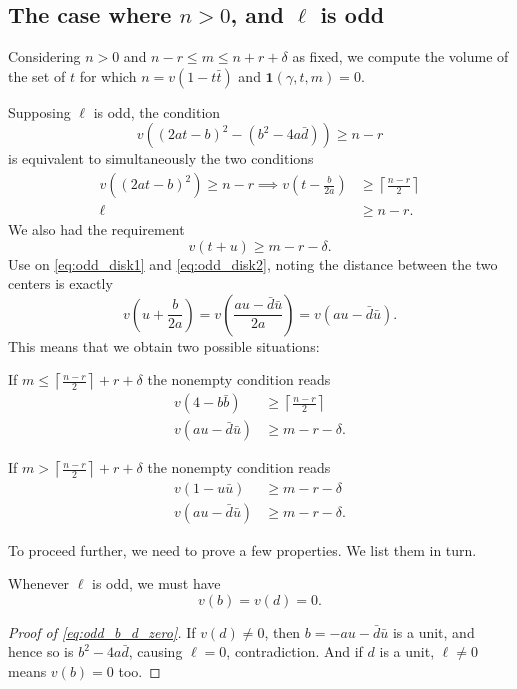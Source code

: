 \subsection{The case where $n > 0$, and $\ell$ is odd}
Considering $n > 0$ and $n-r \le m \le n+r+\delta$ as fixed,
we compute the volume of the set of $t$
for which $n = v(1-t\bar t)$ and $\mathbf{1}(\gamma,t,m) = 0$.

Supposing $\ell$ is odd, the condition
\[ v\left( (2at-b)^2 - (b^2-4a\bar d) \right) \geq n-r \]
is equivalent to simultaneously the two conditions
\begin{align}
  v\left( (2at-b)^2 \right) \geq n-r
  \implies v\left( t-\frac{b}{2a} \right) &\geq \left\lceil \frac{n-r}{2} \right\rceil
  \label{eq:odd_disk1} \\
  \ell &\ge n-r. \label{eq:odd_n_bound}
\end{align}
We also had the requirement
\begin{equation}
  v(t+u) \ge m-r-\delta.
  \label{eq:odd_disk2}
\end{equation}
Use  on \eqref{eq:odd_disk1} and \eqref{eq:odd_disk2},
noting the distance between the two centers is exactly
\[ v\left( u + \frac{b}{2a} \right) = v\left( \frac{au-\bar d \bar u}{2a} \right)
  = v(au - \bar d \bar u). \]
This means that we obtain two possible situations:
\begin{itemize}
  \ii If $m \leq \left\lceil \frac{n-r}{2} \right\rceil + r + \delta$
  the nonempty condition reads
  \begin{align}
    v(4-b\bar b) &\ge \left\lceil \frac{n-r}{2} \right\rceil \label{eq:odd_ineq1} \\
    v(au - \bar d \bar u) &\ge m - r - \delta \label{eq:odd_ineq2}.
  \end{align}

  \ii If $m > \left\lceil \frac{n-r}{2} \right\rceil + r + \delta$
  the nonempty condition reads
  \begin{align}
    v(1-u \bar u) &\ge m-r-\delta \label{eq:odd_ineq3} \\
    v(au - \bar d \bar u) &\ge m - r - \delta \label{eq:odd_ineq4}.
  \end{align}
\end{itemize}
To proceed further, we need to prove a few properties.
We list them in turn.

\begin{fact}
  Whenever $\ell$ is odd, we must have
  \begin{equation}
    v(b) = v(d) = 0.
    \label{eq:odd_b_d_zero}
  \end{equation}
\end{fact}
\begin{proof}
  [Proof of \eqref{eq:odd_b_d_zero}]
  If $v(d) \neq 0$, then $b = -au-\bar d\bar u$ is a unit,
  and hence so is $b^2 - 4 a \bar d$, causing $\ell = 0$, contradiction.
  And if $d$ is a unit, $\ell \neq 0$ means $v(b) = 0$ too.
\end{proof}

